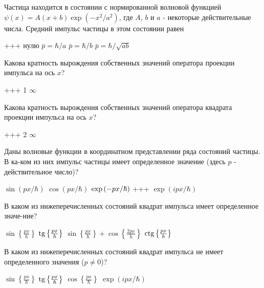 \documentclass[11pt,a4paper]{exam}
\newcommand{\rightchoice}{\choice +++ }
\begin{document}
\begin{questions}
\question Частица находится в состоянии с нормированной волновой функцией $\psi (x) = A(x + b)\exp ( - {x^2}/{a^2})$, где $A$, $b$ и $a$ - некоторые действительные числа. Средний импульс частицы в этом состоянии равен
\begin{choices}
\rightchoice нулю      
\choice $\bar p = \hbar /a$      
\choice $\bar p = \hbar /b$      
\choice $\bar p = \hbar /\sqrt {ab} $
\end{choices}

\question Какова кратность вырождения собственных значений оператора проекции импульса на ось $x$?
\begin{choices}
\rightchoice 1      
\choice $\infty $
\end{choices}

\question Какова кратность вырождения собственных значений оператора квадрата проекции импульса на ось $x$?
\begin{choices}
\rightchoice 2      
\choice $\infty $
\end{choices}

\question Даны волновые функции в координатном представлении ряда состояний частицы. В ка-ком из них импульс частицы имеет определенное значение (здесь $p$ - действительное число)?
\begin{choices}
\choice $\sin \left( {px/\hbar } \right)$      
\choice $\cos \left( {px/\hbar } \right)$    
\choice ${\rm{exp}}\left( { - px/\hbar } \right)$     
\rightchoice $\exp \left( {ipx/\hbar } \right)$ 
\end{choices}

\question В каком из нижеперечисленных состояний квадрат импульса имеет определенное значе-ние?
\begin{choices}
\choice $\sin \left\{ {\frac{{px}}{\hbar }} \right\}$    
\choice ${\rm{tg}}\left\{ {\frac{{px}}{\hbar }} \right\}$      
\choice $\sin \left\{ {\frac{{px}}{\hbar }} \right\} + \cos \left\{ {\frac{{2px}}{\hbar }} \right\}$     
\choice ${\rm{ctg}}\left\{ {\frac{{px}}{\hbar }} \right\}$ 
\end{choices}

\question В каком из нижеперечисленных состояний квадрат импульса не имеет определенного значения ($p \ne 0$)?
\begin{choices}
\choice $\sin \left\{ {\frac{{px}}{\hbar }} \right\}$    
\choice ${\rm{tg}}\left\{ {\frac{{px}}{\hbar }} \right\}$      
\choice $\cos \left\{ {\frac{{px}}{\hbar }} \right\}$    
\choice $\exp \left( {ipx/\hbar } \right)$
\end{choices}


\end{questions}
\end{document}
